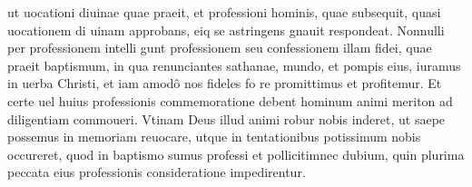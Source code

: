 \documentclass{article}
\begin{document}
\begin{pages}
ut uocationi diuinae quae praeit, et professioni hominis, quae subsequit, quasi uocationem di uinam approbans, eiq se astringens gnauit respondeat. Nonnulli per professionem intelli gunt professionem seu confessionem illam fidei, quae praeit baptismum, in qua renunciantes sathanae, mundo, et pompis eius, iuramus in uerba Christi, et iam amodô nos fideles fo re promittimus et profitemur. Et certe uel huius professionis commemoratione debent hominum animi meriton ad diligentiam commoueri. Vtinam Deus illud animi robur nobis inderet, ut saepe possemus in memoriam reuocare, utque in tentationibus potissimum nobis occureret, quod in baptismo sumus professi et pollicitimnec dubium, quin plurima peccata eius professionis consideratione impedirentur.  \pend
{}
{}

\end{pages}
\end{document}
